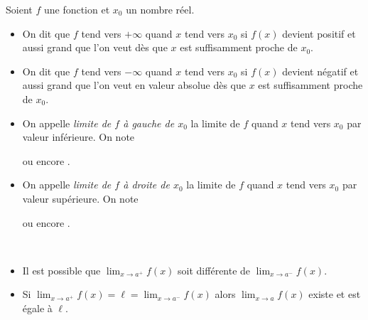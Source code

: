       \begin{defi}[Limites en $x_0$]
            Soient $f$ une fonction et $x_0$ un nombre r\'eel.
            \begin{itemize}
                  \item On dit que $f$ tend vers $+\infty$ quand $x$ tend vers $x_0$ si 
                        $f(x)$ devient positif et aussi grand que l'on veut
                        d\`es que $x$ est suffisamment proche de $x_0$.
                  \item On dit que $f$ tend vers $-\infty$ quand $x$ tend vers $x_0$ si 
                        $f(x)$ devient n\'egatif et aussi grand que l'on veut en valeur absolue
                        d\`es que $x$ est suffisamment proche de $x_0$.
                  \item On appelle \emph{limite de $f$ \`a gauche de $x_0$} 
                        la limite de $f$ quand $x$ tend vers ${x_0}$ par valeur inf\'erieure.
                        On note 
                        \begin{center}
                              ou encore .
                        \end{center}
                  \item On appelle \emph{limite de $f$ \`a droite de ${x_0}$} 
                        la limite de $f$ quand $x$ tend vers ${x_0}$ par valeur sup\'erieure.
                        On note 
                        \begin{center}
                              ou encore .
                        \end{center}
            \end{itemize}
%
      \begin{rmk}~\\[-1\baselineskip]
            \begin{itemize}
            \item Il est possible que $\lim_{x\rightarrow a^+} f(x)$ soit diff\'erente de $\lim_{x\rightarrow a^-} f(x)$.
            \item Si $\lim_{x\rightarrow a^+} f(x) = \ell = \lim_{x\rightarrow a^-} f(x)$ 
                  alors $\lim_{x\rightarrow a} f(x)$ existe et est \'egale \`a $\ell$.
            \end{itemize}
      \end{rmk}
      \end{defi}
